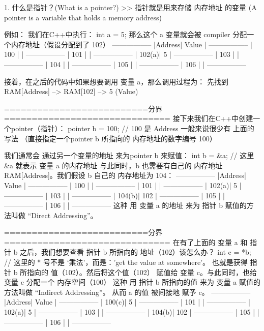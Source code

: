 1. 什么是指针？(What is a pointer?)
>> 指针就是用来存储 内存地址 的变量 (A pointer is a variable that holds a memory address)

例如：
我们在C++中执行：  int a = 5;
那么这个 a 变量就会被 compiler 分配一个内存地址（假设分配到了 102）
-----------------
|Address| Value |
-----------------
| 100   |       |
-----------------
| 101   |       |
-----------------
| 102(a)|   5   |
-----------------
| 103   |       |
-----------------
| 104   |       |
-----------------
| 105   |       |
-----------------
| 106   |       |
-----------------

接着，在之后的代码中如果想要调用 变量 a，那么调用过程为：
先找到 RAM[Address] --> RAM[102] --> 5 (Value)


==========================分界==============================
接下来我们在C++中创建一个pointer（指针）：
pointer b = 100;      // 100 是 Address
一般来说很少有 上面的写法 （直接指定一个pointer b 所指向的 内存地址的数字编号 100）

我们通常会 通过另一个变量的地址 来为pointer b 来赋值：
int b = &a;       // 这里  &a 就表示 变量 a 的内存地址
与此同时，b 也需要有自己的 内存地址 RAM[Address]。我们假设 b 自己的 内存地址为 104：
-----------------
|Address| Value |
-----------------
| 100   |       |
-----------------
| 101   |       |
-----------------
| 102(a)|   5   |
-----------------
| 103   |       |
-----------------
| 104(b)|  102  |
-----------------
| 105   |       |
-----------------
| 106   |       |
-----------------
这种 用 变量 a 的地址 来为 指针 b 赋值的方法叫做 “Direct Addressing”。


==========================分界==============================
在有了上面的 变量 a 和 指针 b 之后，我们想要查看 指针 b 所指向的 地址（102）该怎么办？
int c = *b;       // 这里的 * 号不是 ‘乘法’，而是：'get the value at somewhere'。
也就是获得 指针 b 所指向的 值（102）。然后将这个值（102） 赋值给 变量 c。与此同时，也给 变量 c 分配一个 内存空间（100）
这种 用 指针 b 所指向的值 来为 变量 a 赋值的方法叫做 “Indirect Addressing”。 从而 a 的值 被间接地 赋予 c。
-----------------
|Address| Value |
-----------------
| 100(c)|   5   |
-----------------
| 101   |       |
-----------------
| 102(a)|   5   |
-----------------
| 103   |       |
-----------------
| 104(b)|  102  |
-----------------
| 105   |       |
-----------------
| 106   |       |
-----------------



